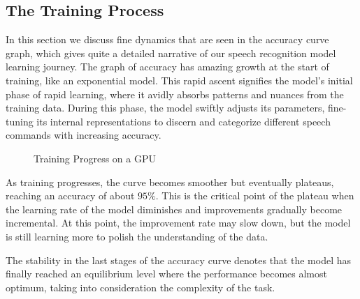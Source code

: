 \documentclass[a4paper]{report}
\begin{document}
{\subsection{The Training Process}
In this section we discuss fine dynamics that are seen in the accuracy curve graph, which gives quite a detailed narrative of our speech recognition model learning journey. The graph of accuracy has amazing growth at the start of training, like an exponential model. This rapid ascent signifies the model's initial phase of rapid learning, where it avidly absorbs patterns and nuances from the training data. During this phase, the model swiftly adjusts its parameters, fine-tuning its internal representations to discern and categorize different speech commands with increasing accuracy.
\begin{figure}[H]
    \centering
    \setlength{\fboxsep}{0pt} %
    \setlength{\fboxrule}{1pt} %
    \caption{Training Progress on a GPU}
    \label{fig:training}
\end{figure}
As training progresses, the curve becomes smoother but eventually plateaus, reaching an accuracy of about $95\%$. This is the critical point of the plateau when the learning rate of the model diminishes and improvements gradually become incremental. At this point, the improvement rate may slow down, but the model is still learning more to polish the understanding of the data.

The stability in the last stages of the accuracy curve denotes that the model has finally reached an equilibrium level where the performance becomes almost optimum, taking into consideration the complexity of the task.

}
\end{document}

